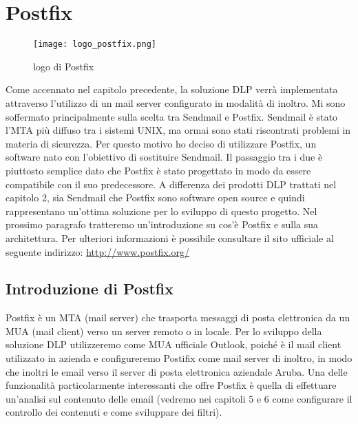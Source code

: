\chapter{Postfix}

\begin{figure}[htp]
    \centering
    \texttt{[image: logo\_postfix.png]}
        \caption{logo di Postfix}\label{logoPostfix}
  \end{figure}
  
  Come accennato nel capitolo precedente, la soluzione DLP verrà implementata attraverso l'utilizzo di un 
  mail server configurato in modalità di inoltro.
  Mi sono soffermato principalmente sulla scelta tra Sendmail e Postfix. 
  Sendmail è stato l'MTA più diffuso tra i sistemi UNIX, ma ormai sono stati riscontrati problemi in materia
  di sicurezza. 
  Per questo motivo ho deciso di utilizzare Postfix, un software nato con l'obiettivo di sostituire Sendmail. Il passaggio
  tra i due è piuttosto semplice dato che Postfix è stato progettato in modo da essere compatibile con il 
  suo predecessore.
  A differenza dei prodotti DLP trattati nel capitolo 2, sia Sendmail che Postfix sono software open source e
  quindi rappresentano un'ottima soluzione per lo sviluppo di questo progetto.
  Nel prossimo paragrafo tratteremo un'introduzione su cos'è Postfix e sulla sua architettura. Per ulteriori
  informazioni è possibile consultare il sito ufficiale al seguente indirizzo: \url{http://www.postfix.org/}
   
  \pagebreak
  \section{Introduzione di Postfix}
  Postfix è un MTA (mail server) che trasporta messaggi di posta elettronica da un MUA (mail client) verso un server remoto o in locale. Per lo sviluppo della soluzione DLP utilizzeremo come MUA ufficiale Outlook, poiché è il mail client utilizzato in azienda e configureremo Postifix come mail server di inoltro, in modo che inoltri le email verso il server di posta elettronica aziendale Aruba. Una delle funzionalità particolarmente interessanti che offre Postfix è quella di effettuare un’analisi sul contenuto delle email (vedremo nei capitoli 5 e 6 come configurare il controllo dei contenuti e come sviluppare dei filtri).
  

